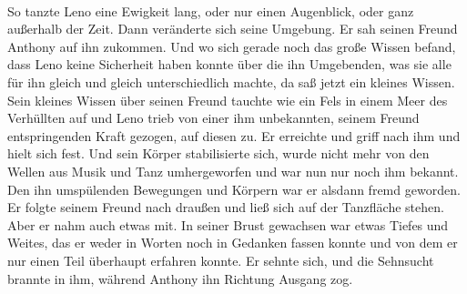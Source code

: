 \documentclass[ngerman,smalldemyvopaper,11pt,oneside,onecolumn,openright,extrafontsizes]{memoir}
\begin{document}
\vspace{0.5em} \\
So tanzte Leno eine Ewigkeit lang, oder nur einen Augenblick, oder ganz außerhalb der Zeit. Dann veränderte sich seine Umgebung. Er sah seinen Freund Anthony auf ihn zukommen. Und wo sich gerade noch das große Wissen befand, dass Leno keine Sicherheit haben konnte über die ihn Umgebenden, was sie alle für ihn gleich und gleich unterschiedlich machte, da saß jetzt ein kleines Wissen. Sein kleines Wissen über seinen Freund tauchte wie ein Fels in einem Meer des Verhüllten auf und Leno trieb von einer ihm unbekannten, seinem Freund entspringenden Kraft gezogen, auf diesen zu. Er erreichte und griff nach ihm und hielt sich fest. Und sein Körper stabilisierte sich, wurde nicht mehr von den Wellen aus Musik und Tanz umhergeworfen und war nun nur noch ihm bekannt. Den ihn umspülenden Bewegungen und Körpern war er alsdann fremd geworden. Er folgte seinem Freund nach draußen und ließ sich auf der Tanzfläche stehen. Aber er nahm auch etwas mit. In seiner Brust gewachsen war etwas Tiefes und Weites, das er weder in Worten noch in Gedanken fassen konnte und von dem er nur einen Teil überhaupt erfahren konnte. Er sehnte sich, und die Sehnsucht brannte in ihm, während Anthony ihn Richtung Ausgang zog.
\end{document}
